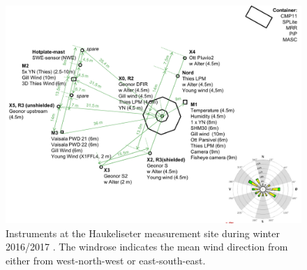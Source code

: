 
\begin{figure}
\centering
	\includegraphics[width=\textwidth]{./fig_instruments/instrument_setting.png}
	\caption{Instruments at the Haukeliseter measurement site during winter 2016/2017 \citep[adapdet from][]{wolff_derivation_2015}. The windrose indicates the mean wind direction from either from west-north-west or east-south-east.}\label{fig:inst_setting}
\end{figure}
